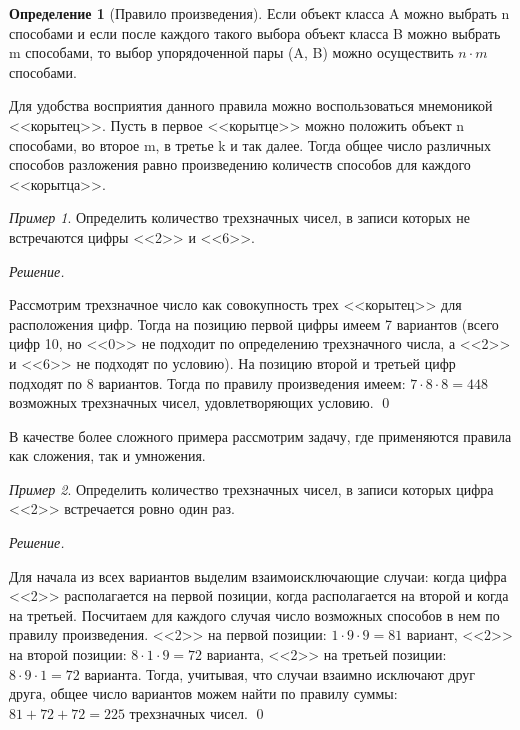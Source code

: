 \documentclass[12pt,a4paper]{article}
\theoremstyle{definition}
\newtheorem{definition}{Определение}[section]
\theoremstyle{definition}
\theoremstyle{remark}
\theoremstyle{corollary}
\newcommand{\nextblock}{\vspace{1.5em}\noindent}
\theoremstyle{bolditalic}
\newtheorem{example}{Пример}[section]
\newenvironment{solution}{
    \vspace{0.5em}
    \noindent\textit{Решение.}
}{\qed\vspace{1em}}
\begin{document}
\begin{definition}[Правило произведения]
Если объект класса A можно выбрать n способами и если после каждого такого выбора объект класса B можно выбрать m способами, то выбор упорядоченной пары (A, B) можно осуществить $n \cdot m$ способами.
\end{definition}

Для удобства восприятия данного правила можно воспользоваться мнемоникой <<корытец>>. Пусть в первое <<корытце>> можно положить объект n способами, во второе m, в третье k и так далее. Тогда общее число различных способов разложения равно произведению количеств способов для каждого <<корытца>>.


\begin{example}
    Определить количество трехзначных чисел, в записи которых не встречаются цифры <<2>> и <<6>>.
\end{example}
\begin{solution}
    Рассмотрим трехзначное число как совокупность трех <<корытец>> для расположения цифр. Тогда на позицию первой цифры имеем 7 вариантов (всего цифр 10, но <<0>> не подходит по определению трехзначного числа, а <<2>> и <<6>> не подходят по условию). На позицию второй и третьей цифр подходят по 8 вариантов. Тогда по правилу произведения имеем: $7 \cdot 8 \cdot 8 = 448$ возможных трехзначных чисел, удовлетворяющих условию.
\end{solution}

\nextblock

В качестве более сложного примера рассмотрим задачу, где применяются правила как сложения, так и умножения.

\begin{example}
    Определить количество трехзначных чисел, в записи которых цифра <<2>> встречается ровно один раз.    
\end{example}
\begin{solution}
    Для начала из всех вариантов выделим взаимоисключающие случаи: когда цифра <<2>> располагается на первой позиции, когда располагается на второй и когда на третьей. Посчитаем для каждого случая число возможных способов в нем по правилу произведения. <<2>> на первой позиции: $1 \cdot 9 \cdot 9 = 81$ вариант, <<2>> на второй позиции: $8 \cdot 1 \cdot 9 = 72$ варианта, <<2>> на третьей позиции: $8 \cdot 9 \cdot 1 = 72$ варианта. Тогда, учитывая, что случаи взаимно исключают друг друга, общее число вариантов можем найти по правилу суммы: $81 + 72 + 72 = 225$ трехзначных чисел.
\end{solution}
\end{document}
